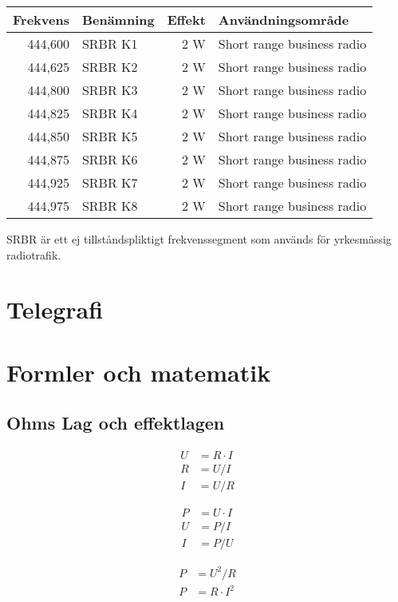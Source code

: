 \documentclass[12pt,swedish,a4paper]{article}
\begin{document}
\begin{tabular}{rlrl}
	Frekvens & Benämning & Effekt & Användningsområde          \\ \hline
	 444,600 & SRBR K1   &    2 W & Short range business radio \\
	 444,625 & SRBR K2   &    2 W & Short range business radio \\
	 444,800 & SRBR K3   &    2 W & Short range business radio \\
	 444,825 & SRBR K4   &    2 W & Short range business radio \\
	 444,850 & SRBR K5   &    2 W & Short range business radio \\
	 444,875 & SRBR K6   &    2 W & Short range business radio \\
	 444,925 & SRBR K7   &    2 W & Short range business radio \\
	 444,975 & SRBR K8   &    2 W & Short range business radio
\end{tabular}

SRBR är ett ej tillståndspliktigt frekvenssegment som används för yrkesmässig radiotrafik.

\section{Telegrafi}

\section{Formler och matematik}

\subsection{Ohms Lag och effektlagen}

\begin{align}
U &= R\cdot I\\
R &= U/I\\
I &= U/R
\end{align}

\begin{align}
P &= U \cdot I\\
U &= P/I\\
I &= P/U
\end{align}

\begin{align}
P &= U^2/R\\
P &= R \cdot I^2
\end{align}
\end{document}
